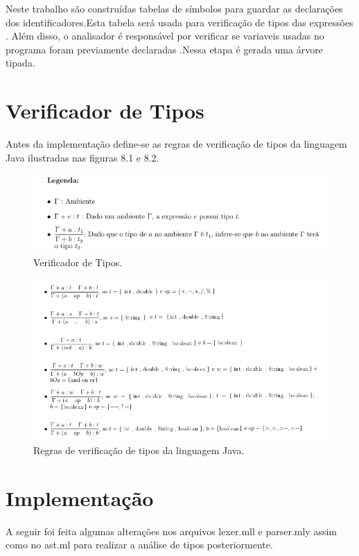 \documentclass[12pt,a4paper,twoside]{report}
\begin{document}
Neste trabalho são construídas tabelas de símbolos para guardar as declarações dos identificadores.Esta tabela será usada para verificação de tipos das expressões .
Além disso, o analisador é responsável por verificar se variaveis usadas no programa foram previamente declaradas .Nessa etapa é gerada uma árvore tipada.
\section{Verificador de Tipos}
Antes da implementação define-se as regras de verificação de tipos da linguagem Java ilustradas nas figuras 8.1 e 8.2.
\begin{figure}[!ht]
\centering
\caption{Verificador de Tipos.
      \label{fig:3}}
\includegraphics[scale=1]{imagens/ambientesemantico.png}
\end{figure}

\begin{figure}[!ht]
\centering
\caption{Regras de verificação de tipos da linguagem Java.
      \label{fig:4}}
\includegraphics[scale=1]{imagens/ambientesemanticoregras.png}
\end{figure}

\section{Implementação}

A seguir foi feita algumas alterações nos arquivos lexer.mll e parser.mly assim como no ast.ml para realizar a análise de tipos posteriormente.
\end{document}
